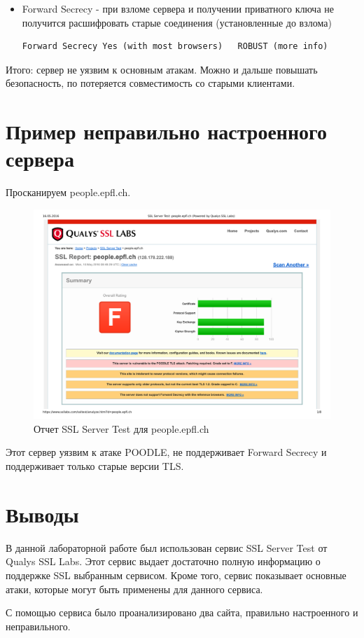 \begin{itemize}
	\item Forward Secrecy - при взломе сервера и получении приватного ключа не получится расшифровать старые соединения (установленные до взлома)
	\begin{lstlisting}
Forward Secrecy	Yes (with most browsers)   ROBUST (more info)
	\end{lstlisting}
\end{itemize}

Итого: сервер не уязвим к основным атакам. Можно и дальше повышать безопасность, по потеряется совместимость со старыми клиентами.

\section{Пример неправильно настроенного сервера}

Просканируем people.epfl.ch.

\begin{figure}[H]
	\centering
	\includegraphics[width=\textwidth]{test2.pdf}
	\caption{Отчет SSL Server Test для people.epfl.ch}
\end{figure}

Этот сервер уязвим к атаке POODLE, не поддерживает Forward Secrecy и поддерживает только старые версии TLS.

\section{Выводы}
В данной лабораторной работе был использован сервис SSL Server Test от Qualys SSL Labs. Этот сервис выдает достаточно полную информацию о поддержке SSL выбранным сервисом. Кроме того, сервис показывает основные атаки, которые могут быть применены для данного сервиса.

С помощью сервиса было проанализировано два сайта, правильно настроенного и неправильного.